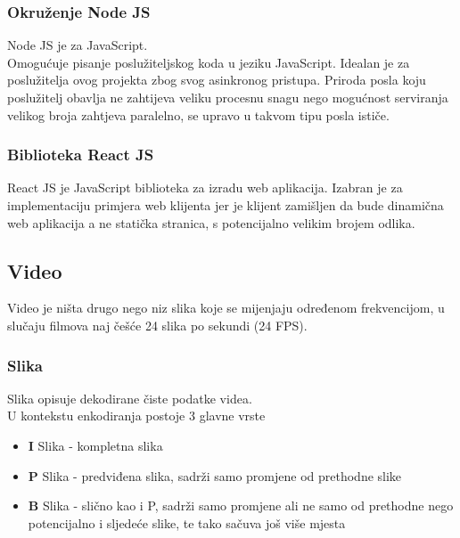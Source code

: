 \subsubsection{Okruženje Node JS}
Node JS je  za JavaScript. \\
Omogućuje pisanje poslužiteljskog koda u jeziku JavaScript. \cite{nodeBook}
\paraBreak
Idealan je za poslužitelja ovog projekta zbog svog  asinkronog pristupa.
Priroda posla koju poslužitelj obavlja ne zahtijeva veliku procesnu snagu nego mogućnost serviranja velikog broja zahtjeva
paralelno,  se upravo u takvom tipu posla ističe. \cite{nodeBook}

\subsubsection{Biblioteka React JS}
React JS je  JavaScript biblioteka za izradu web aplikacija.
\paraBreak
Izabran je za implementaciju primjera web klijenta jer je klijent zamišljen da bude dinamična web aplikacija a ne statička
stranica, s potencijalno velikim brojem odlika. \cite{reactBook}
\paraBreak

\clearpage
\subsection{Video} \label{sec:video}
Video je ništa drugo nego niz slika koje se mijenjaju određenom frekvencijom, u slučaju filmova naj češće 24 slika 
po sekundi (24 FPS). \cite{ffmpegBook}

\subsubsection{Slika} \label{sec:slika}
Slika opisuje dekodirane čiste podatke videa. \\
U kontekstu enkodiranja postoje 3 glavne vrste \begin{itemize}
  \item \textbf{I} Slika - kompletna slika
  \item \textbf{P} Slika - predviđena slika, sadrži samo promjene od prethodne slike
  \item \textbf{B} Slika - slično kao i P, sadrži samo promjene ali ne samo od prethodne nego potencijalno i sljedeće 
  slike, te tako sačuva još više mjesta
\end{itemize}

